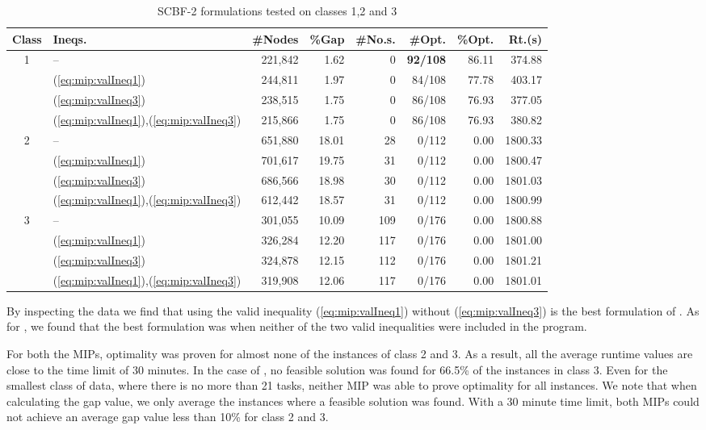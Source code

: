 \begin{table}[tpb]
	\caption{SCBF-2 formulations tested on classes 1,2 and 3}
	\centering
	\vspace{2mm}
	\begin{tabular}{clrrrrrr}
		\toprule
		Class & Ineqs. & \#Nodes & \%Gap & \#No.s. & \#Opt. & \%Opt. & Rt.(s) \\\midrule\midrule
		1 & -- & 221,842 & 1.62 & 0 & \bf{92}/108 & 86.11 & 374.88 \\
		 & (\ref{eq:mip:valIneq1}) & 244,811 & 1.97 & 0 & 84/108 & 77.78 & 403.17 \\
		 & (\ref{eq:mip:valIneq3}) & 238,515 & 1.75 & 0 & 86/108 & 76.93 & 377.05  \\
		 & (\ref{eq:mip:valIneq1}),(\ref{eq:mip:valIneq3}) & 215,866 & 1.75 & 0 & 86/108 & 76.93 & 380.82  \\\midrule
		2 & -- & 651,880 & 18.01 & 28 & 0/112 & 0.00 & 1800.33 \\
		 & (\ref{eq:mip:valIneq1}) & 701,617 & 19.75 & 31 & 0/112 & 0.00 & 1800.47 \\
		 & (\ref{eq:mip:valIneq3}) & 686,566 & 18.98 & 30 & 0/112 & 0.00 & 1801.03 \\
		 & (\ref{eq:mip:valIneq1}),(\ref{eq:mip:valIneq3}) & 612,442 & 18.57 & 31 & 0/112 & 0.00 & 1800.99 \\\midrule
		3 & -- & 301,055 & 10.09 & 109 & 0/176 & 0.00 & 1800.88 \\
		 & (\ref{eq:mip:valIneq1}) & 326,284 & 12.20 & 117 & 0/176 & 0.00 & 1801.00 \\
		 & (\ref{eq:mip:valIneq3}) & 324,878 & 12.15 & 112 & 0/176 & 0.00 & 1801.21 \\
		 & (\ref{eq:mip:valIneq1}),(\ref{eq:mip:valIneq3}) & 319,908 & 12.06 & 117 & 0/176 & 0.00 & 1801.01 \\
		\bottomrule
	\end{tabular}
	\label{tab:exp:resultsSCBF}
\end{table}

By inspecting the data we find that using the 
valid inequality (\ref{eq:mip:valIneq1})
without (\ref{eq:mip:valIneq3}) is the best 
formulation of .
As for , we found that the best formulation
was when neither of the two valid inequalities were included in
the program.

For both the MIPs, optimality was proven for almost none of the instances of
class 2 and 3.
As a result, all the average runtime values are close
to the time limit of 30 minutes.
In the case of , no feasible solution was found for 66.5\% of the instances
in class 3.
Even for the smallest class of data, where there is no more
than 21 tasks, neither MIP was able to prove
optimality for all instances.
We note that when calculating the gap value, we only average
the instances where a feasible solution was found.
With a 30 minute time limit, both MIPs could not achieve
an average gap value less than 10\% for class 2 and 3.

